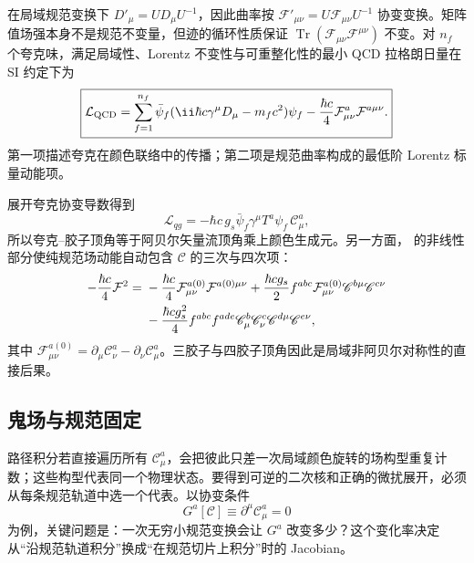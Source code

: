 在局域规范变换下 $D'_\mu=UD_\mu U^{-1}$，因此曲率按 $\mathcal F'_{\mu\nu}=U\mathcal F_{\mu\nu}U^{-1}$ 协变变换。矩阵值场强本身不是规范不变量，但迹的循环性质保证 $\operatorname{Tr}(\mathcal F_{\mu\nu}\mathcal F^{\mu\nu})$ 不变。对 $n_f$ 个夸克味，满足局域性、Lorentz 不变性与可重整化性的最小 QCD 拉格朗日量在 SI 约定下为
\begin{equation}
\boxed{
\mathcal L_{\rm QCD}
=\sum_{f=1}^{n_f}\bar\psi_f(\ii\hbar c\gamma^\mu D_\mu-m_fc^2)\psi_f
-\frac{\hbar c}{4}\mathcal F_{\mu\nu}^a\mathcal F^{a\mu\nu}.}
\label{eq:qcd-lagrangian-si-dp10}
\end{equation}
第一项描述夸克在颜色联络中的传播；第二项是规范曲率构成的最低阶 Lorentz 标量动能项。

展开夸克协变导数得到
\begin{equation}
\mathcal L_{qg}
=-\hbar c\,g_s\bar\psi_f\gamma^\mu T^a\psi_f\,\mathscr C_\mu^a,
\label{eq:qcd-quark-gluon-interaction-dp10}
\end{equation}
所以夸克--胶子顶角等于阿贝尔矢量流顶角乘上颜色生成元。另一方面， 的非线性部分使纯规范场动能自动包含 $\mathscr C$ 的三次与四次项：
\begin{align}
-\frac{\hbar c}{4}\mathcal F^2
={}&-\frac{\hbar c}{4}\mathcal F_{\mu\nu}^{a(0)}\mathcal F^{a(0)\mu\nu}
+\frac{\hbar c g_s}{2}f^{abc}\mathcal F_{\mu\nu}^{a(0)}\mathscr C^{b\mu}\mathscr C^{c\nu}\notag\\
&-\frac{\hbar c g_s^2}{4}f^{abc}f^{ade}
\mathscr C_\mu^b\mathscr C_\nu^c\mathscr C^{d\mu}\mathscr C^{e\nu},
\label{eq:yang-mills-expanded-3-4-gluon-dp10}
\end{align}
其中 $\mathcal F_{\mu\nu}^{a(0)}=\partial_\mu\mathscr C_\nu^a-\partial_\nu\mathscr C_\mu^a$。三胶子与四胶子顶角因此是局域非阿贝尔对称性的直接后果。



\subsection{鬼场与规范固定}

路径积分若直接遍历所有 $\mathscr C_\mu^a$，会把彼此只差一次局域颜色旋转的场构型重复计数；这些构型代表同一个物理状态。要得到可逆的二次核和正确的微扰展开，必须从每条规范轨道中选一个代表。以协变条件
\begin{equation*}
 G^a[\mathscr C]\equiv\partial^\mu\mathscr C_\mu^a=0
\end{equation*}
为例，关键问题是：一次无穷小规范变换会让 $G^a$ 改变多少？这个变化率决定从“沿规范轨道积分”换成“在规范切片上积分”时的 Jacobian。

